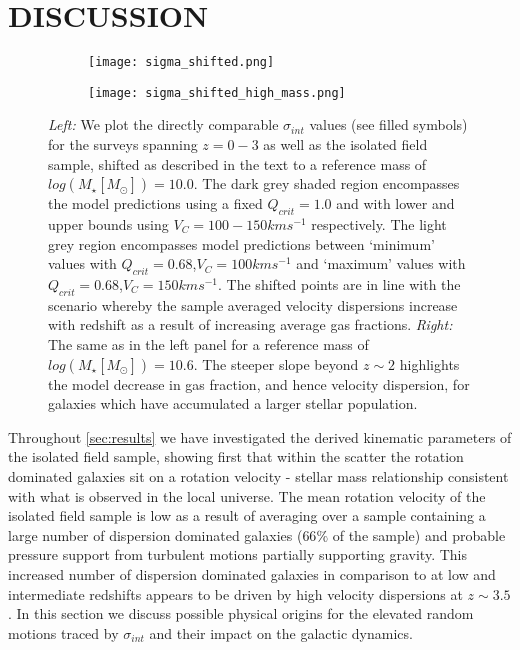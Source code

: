 \documentclass[fleqn,usenatbib]{mn2e}
\begin{document}
\section{DISCUSSION}\label{sec:discussion}


\begin{figure*}
    \centering \hspace{-1.3cm}
    \begin{subfigure}[h!]{0.5\textwidth}
        \centering
        \texttt{[image: sigma\_shifted.png]}
    \end{subfigure} \hspace{+0.4cm}
    \begin{subfigure}[h!]{0.5\textwidth}
        \centering
        \texttt{[image: sigma\_shifted\_high\_mass.png]}
    \end{subfigure}
    \caption{{\it Left:} We plot the directly comparable $\sigma_{int}$ values (see filled symbols) for the surveys spanning $z=0-3$ as well as the isolated field sample, shifted as described in the text to a reference mass of $log(M_{\star}[M_{\odot}]) = 10.0$.
    The dark grey shaded region encompasses the model predictions using a fixed $Q_{crit} = 1.0$ and with lower and upper bounds using $V_{C} = 100-150kms^{-1}$ respectively.
    The light grey region encompasses model predictions between `minimum' values with $Q_{crit} = 0.68$,$V_{C}=100kms^{-1}$ and `maximum' values with $Q_{crit} = 0.68$,$V_{C}=150kms^{-1}$.
    The shifted points are in line with the scenario whereby the sample averaged velocity dispersions increase with redshift as a result of increasing average gas fractions. 
    {\it Right:} The same as in the left panel for a reference mass of $log(M_{\star}[M_{\odot}]) = 10.6$.
    The steeper slope beyond $z\sim2$ highlights the model decrease in gas fraction, and hence velocity dispersion, for galaxies which have accumulated a larger stellar population.}
    \label{fig:sigma_shifted}
\end{figure*}

Throughout \cref{sec:results} we have investigated the derived kinematic parameters of the isolated field sample, showing first that within the scatter the rotation dominated galaxies sit on a rotation velocity - stellar mass relationship consistent with what is observed in the local universe.
The mean rotation velocity of the isolated field sample is low as a result of averaging over a sample containing a large number of dispersion dominated galaxies ($66\%$ of the sample) and probable pressure support from turbulent motions \citep[e.g.][]{Burkert2010} partially supporting gravity.
This increased number of dispersion dominated galaxies in comparison to at low and intermediate redshifts appears to be driven by high velocity dispersions at $z\sim3.5$.
In this section we discuss possible physical origins for the elevated random motions traced by $\sigma_{int}$ and their impact on the galactic dynamics.
\end{document}
